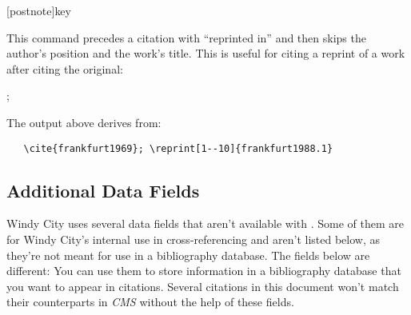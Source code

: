 \documentclass[11pt,letterpaper,oneside]{article}
\begin{document}
\begin{ltxsyntax}
[postnote]{key}

This command precedes a citation with ``reprinted in'' and then skips
the author's position and the work's title. This is useful for citing
a reprint of a work after citing the original:

\begin{citebib}
\item \cite{frankfurt1969}; 
\end{citebib}

\noindent The output above derives from:

\begin{verbatim}
   \cite{frankfurt1969}; \reprint[1--10]{frankfurt1988.1}
\end{verbatim}

\end{ltxsyntax}

\subsection{Additional Data Fields}
\label{datafields}

Windy City uses several data fields that aren't available with
\biblatex. Some of them are for Windy City's internal use in
cross-referencing and aren't listed below, as they're not meant for
use in a bibliography database. The fields below are different: You
can use them to store information in a bibliography database that you
want to appear in citations. Several citations in this document won't
match their counterparts in \textit{CMS} without the help of these
fields.
\end{document}
